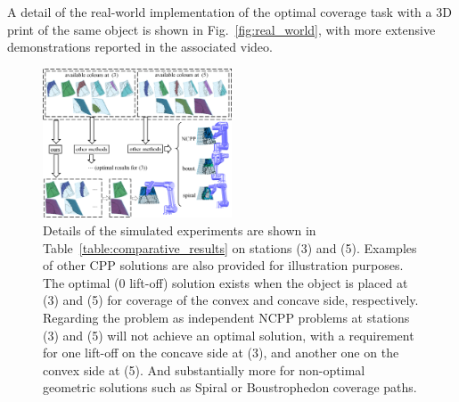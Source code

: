 \documentclass[letterpaper,journal]{IEEEtran}
\begin{document}
A detail of the real-world implementation of the optimal coverage task with a 3D print of the same object is shown in Fig.~\ref{fig:real_world}, with more extensive demonstrations reported in the associated video. 


\begin{figure}[t]
\centering
\includegraphics[width = 0.5\textwidth]{figures/blade_demo/details} %
\caption{Details of the simulated experiments are shown in Table~\ref{table:comparative_results} on stations (3) and (5). Examples of other CPP solutions are also provided for illustration purposes.
The optimal ($0$ lift-off) solution exists when the object is placed at (3) and (5) for coverage of the convex and concave side, respectively. Regarding the problem as independent NCPP problems at stations (3) and (5) will not achieve an optimal solution, with a requirement for one lift-off on the concave side at (3), and another one on the convex side at (5). And substantially more for non-optimal geometric solutions such as Spiral or Boustrophedon coverage paths.}
\label{fig:detailed_colour}
\vspace{-0.5cm}
\end{figure}
\end{document}
